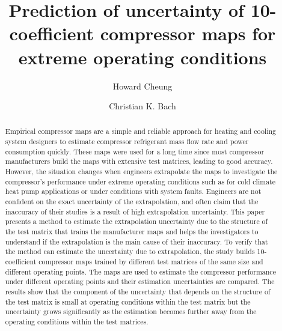 \documentclass[a4paper]{jpconf}
\newcommand{\blCom}[1]{}  %
\begin{document}
\title{Prediction of uncertainty of 10-coefficient compressor maps for extreme operating conditions}

\author{Howard Cheung}

\address{Postdoctoral Research Fellow, Ray W. Herrick Laboratories, School of Mechanical Engineering, Purdue University, 177 S. Russell St., West Lafayette, IN 47907-2031, US}


\author{Christian K. Bach}

\address{Assistant Professor, Mechanical and Aerospace Engineering, Oklahoma State University, 218 Engineering North, Stillwater, OK 74078-5016}


\begin{abstract}
Empirical compressor maps are a simple and reliable approach for heating and cooling system designers to estimate compressor refrigerant mass flow rate and power consumption quickly. These maps were used for a long time since most compressor manufacturers build the maps with extensive test matrices, leading to good accuracy. However, the situation changes when engineers extrapolate the maps to investigate the compressor's performance under extreme operating conditions such as for cold climate heat pump applications or under conditions with system faults.  Engineers are not confident on the exact uncertainty of the extrapolation, and often claim that the inaccuracy of their studies is a result of high extrapolation uncertainty. This paper presents a method to estimate the extrapolation uncertainty due to the structure of the test matrix that trains the manufacturer maps and helps the investigators to understand if the extrapolation is the main cause of their inaccuracy. To verify that the method can estimate the uncertainty due to extrapolation, the study builds 10-coefficient compressor maps trained by different test matrices of the same size and different operating points. The maps are used to estimate the compressor performance under different operating points and their estimation uncertainties are compared. The results show that the component of the uncertainty that depends on the structure of the test matrix is small at operating conditions within the test matrix but the uncertainty grows significantly as the estimation becomes further away from the operating conditions within the test matrices.\blCom{Some comment.  See main\_doc.tex \textbackslash blCom for how to get rid of it :)}
\end{abstract}
\end{document}
